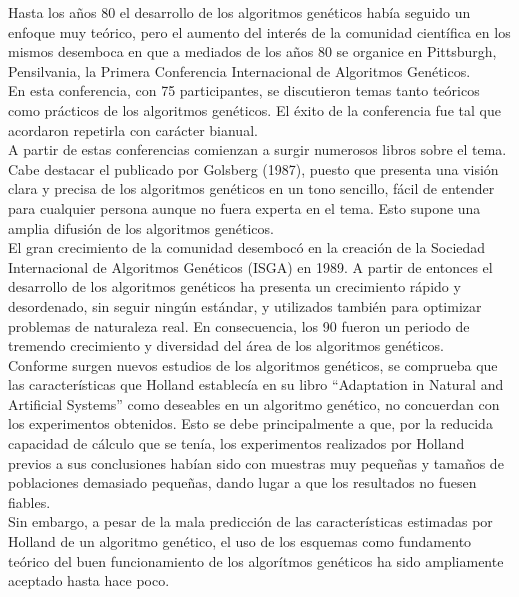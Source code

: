 \documentclass[12pt]{article} \usepackage[utf8x]{inputenc}
\begin{document}
Hasta los años 80 el desarrollo de los algoritmos genéticos había
seguido un enfoque muy teórico, pero el aumento del interés de la
comunidad científica en los mismos desemboca en que a mediados de los
años 80 se organice
en Pittsburgh, Pensilvania, la Primera Conferencia Internacional de Algoritmos Genéticos.\\

En esta conferencia, con 75 participantes, se discutieron temas tanto
teóricos como prácticos de los algoritmos genéticos. El éxito de la
conferencia fue tal que acordaron repetirla con
carácter bianual.\\

A partir de estas conferencias comienzan a surgir numerosos libros
sobre el tema. Cabe destacar el publicado por Golsberg (1987), puesto
que presenta una visión clara y precisa de los algoritmos genéticos en
un tono sencillo, fácil de entender para cualquier persona aunque no
fuera experta en el tema. Esto supone una amplia
difusión de los algoritmos genéticos.\\

El gran crecimiento de la comunidad desembocó en la creación de la
Sociedad Internacional de Algoritmos Genéticos (ISGA) en 1989. A
partir de entonces el desarrollo de los algoritmos genéticos ha
presenta un crecimiento rápido y desordenado, sin seguir ningún
estándar, y utilizados también para optimizar problemas de naturaleza
real. En consecuencia, los 90 fueron un periodo de tremendo
crecimiento y diversidad del área de los algoritmos genéticos. \\


Conforme surgen nuevos estudios de los algoritmos genéticos, se
comprueba que las características que Holland establecía en su libro
``Adaptation in Natural and Artificial Systems'' como deseables en un
algoritmo genético, no concuerdan con los experimentos obtenidos. Esto
se debe principalmente a que, por la reducida capacidad de cálculo que
se tenía, los experimentos realizados por Holland previos a sus
conclusiones habían sido con muestras muy pequeñas y tamaños de
poblaciones demasiado
pequeñas, dando lugar a que los resultados no fuesen fiables. \\

Sin embargo, a pesar de la mala predicción de las características
estimadas por Holland de un algoritmo genético, el uso de los esquemas
como fundamento teórico del buen funcionamiento de los
algorítmos genéticos ha sido ampliamente aceptado hasta hace poco.\\
\end{document}
